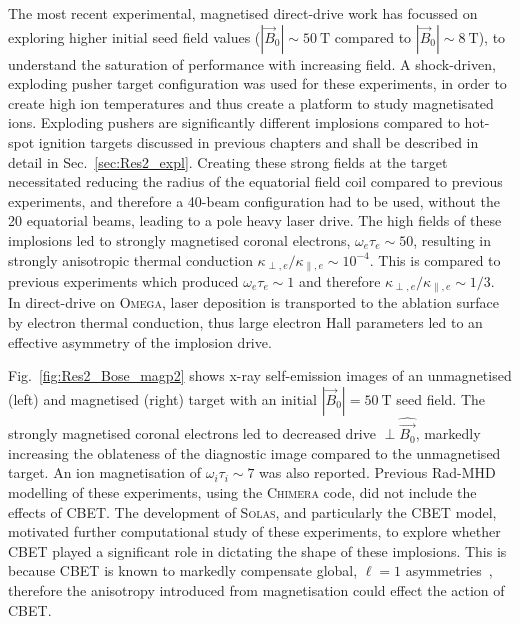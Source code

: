 The most recent experimental, magnetised direct-drive work has focussed on exploring higher initial seed field values ($|\vec{B}_0|\sim50\ \text{T}$ compared to $|\vec{B}_0|\sim8\ \text{T}$), to understand the saturation of performance with increasing field.
A shock-driven, exploding pusher target configuration was used for these experiments, in order to create high ion temperatures and thus create a platform to study magnetisated ions.
Exploding pushers are significantly different implosions compared to hot-spot ignition targets discussed in previous chapters and shall be described in detail in Sec.~\ref{sec:Res2_expl}.
Creating these strong fields at the target necessitated reducing the radius of the equatorial field coil compared to previous experiments, and therefore a 40-beam configuration had to be used, without the 20 equatorial beams, leading to a pole heavy laser drive.
The high fields of these implosions led to strongly magnetised coronal electrons, $\omega_e\tau_e\sim50$, resulting in strongly anisotropic thermal conduction $\kappa_{\perp,e}/\kappa_{\parallel,e}\sim10^{-4}$.
This is compared to previous experiments which produced $\omega_e\tau_e\sim1$ and therefore $\kappa_{\perp,e}/\kappa_{\parallel,e}\sim1/3$.
In direct-drive on \textsc{Omega}, laser deposition is transported to the ablation surface by electron thermal conduction, thus large electron Hall parameters led to an effective asymmetry of the implosion drive.

Fig.~\ref{fig:Res2_Bose_magp2} shows x-ray self-emission images of an unmagnetised (left) and magnetised (right) target with an initial $|\vec{B}_0|=50\ \text{T}$ seed field.
The strongly magnetised coronal electrons led to decreased drive $\perp\hat{\vec{B_0}}$, markedly increasing the oblateness of the diagnostic image compared to the unmagnetised target.
An ion magnetisation of $\omega_i\tau_i\sim7$ was also reported.
Previous \ac{Rad-MHD} modelling of these experiments, using the \textsc{Chimera} code, did not include the effects of \ac{CBET}.
The development of \textsc{Solas}, and particularly the \ac{CBET} model, motivated further computational study of these experiments, to explore whether \ac{CBET} played a significant role in dictating the shape of these implosions.
This is because \ac{CBET} is known to markedly compensate global, $\ell=1$ asymmetries~\cite{anderson_effect_2020,colaitis_inverse_2021}, therefore the anisotropy introduced from magnetisation could effect the action of \ac{CBET}.

